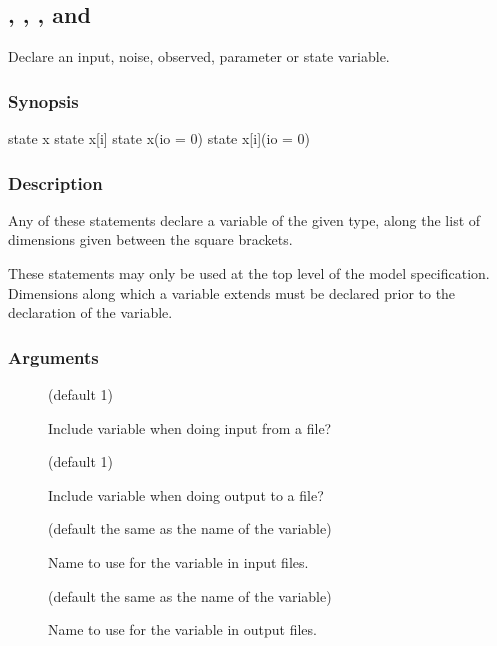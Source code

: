 \subsection{\label{input}, \label{noise}, \label{obs}, \label{param} and \label{state}}

Declare an input, noise, observed, parameter or state variable.

\subsubsection*{Synopsis\label{var_Synopsis}}

\begin{bicode}
    state x
    state x[i]
    state x(io = 0)
    state x[i](io = 0)
\end{bicode}

\subsubsection*{Description\label{var_Description}}

Any of these statements declare a variable of the given type, along the list
of dimensions given between the square brackets.

These statements may only be used at the top level of the model
specification. Dimensions along which a variable extends must be declared
prior to the declaration of the variable.

\subsubsection*{Arguments\label{var_Arguments}}

\begin{description}
\item[] (default 1)

Include variable when doing input from a file?

\item[] (default 1)

Include variable when doing output to a file?

\item[] (default the same as the name of the
  variable)

Name to use for the variable in input files.

\item[] (default the same as the name of the
  variable)

Name to use for the variable in output files.
\end{description}

